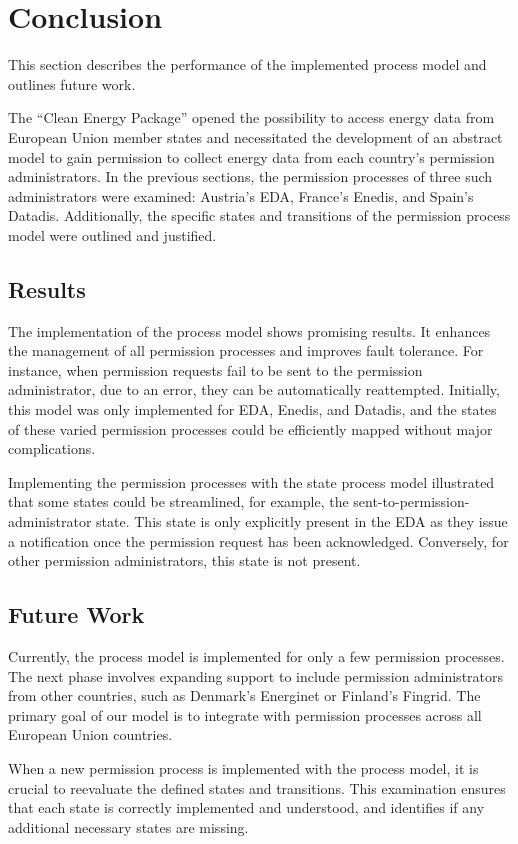 \section{Conclusion}\label{sec:conclusion}
This section describes the performance of the implemented process model and outlines future work.

The ``Clean Energy Package'' opened the possibility to access energy data from European Union member states
and necessitated the development of an abstract model
to gain permission to collect energy data from each country's permission administrators.
In the previous sections, the permission processes of three such administrators were examined:
Austria's EDA, France's Enedis, and Spain's Datadis.
Additionally, the specific states and transitions of the permission process model were outlined and justified.

\subsection{Results}\label{subsec:results}
The implementation of the process model shows promising results.
It enhances the management of all permission processes and improves fault tolerance.
For instance, when permission requests fail to be sent to the permission administrator, due to an error,
they can be automatically reattempted.
Initially, this model was only implemented for EDA, Enedis, and Datadis,
and the states of these varied permission processes could be efficiently mapped without major complications.

Implementing the permission processes with the state process model illustrated that some states could be streamlined,
for example, the sent-to-permission-administrator state.
This state is only explicitly present in the EDA
as they issue a notification once the permission request has been acknowledged.
Conversely, for other permission administrators, this state is not present.

\subsection{Future Work}\label{subsec:future-work}
Currently, the process model is implemented for only a few permission processes.
The next phase involves expanding support to include permission administrators from other countries,
such as Denmark's Energinet or Finland's Fingrid.
The primary goal of our model is to integrate with permission processes across all European Union countries.

When a new permission process is implemented with the process model,
it is crucial to reevaluate the defined states and transitions.
This examination ensures that each state is correctly implemented and understood,
and identifies if any additional necessary states are missing.
